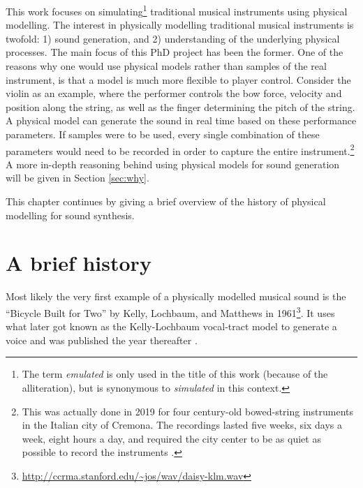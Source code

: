 This work focuses on simulating\footnote{The term \textit{emulated} is only used in the title of this work (because of the alliteration), but is synonymous to \textit{simulated} in this context.} traditional musical instruments using physical modelling. 
The interest in physically modelling traditional musical instruments is twofold: 1) sound generation, and 2) understanding of the underlying physical processes. The main focus of this PhD project has been the former. One of the reasons why one would use physical models rather than samples of the real instrument, is that a model is much more flexible to player control. Consider the violin as an example, where the performer controls the bow force, velocity and position along the string, as well as the finger determining the pitch of the string. A physical model can generate the sound in real time based on these performance parameters. If samples were to be used, every single combination of these parameters would need to be recorded in order to capture the entire instrument.\footnote{This was actually done in 2019 for four century-old bowed-string instruments in the Italian city of Cremona. The recordings lasted five weeks, six days a week, eight hours a day, and required the city center to be as quiet as possible to record the instruments \cite{nytimes, npr}.}
A more in-depth reasoning behind using physical models for sound generation will be given in Section \ref{sec:why}.

This chapter continues by giving a brief overview of the history of physical modelling for sound synthesis.

\section{A brief history}\label{sec:history}


Most likely the very first example of a physically modelled musical sound is the ``Bicycle Built for Two'' by Kelly, Lochbaum, and Matthews in 1961\footnote{\url{http://ccrma.stanford.edu/~jos/wav/daisy-klm.wav}}. It uses what later got known as the Kelly-Lochbaum vocal-tract model to generate a voice and was published the year thereafter \cite{Kelly1962}. 

